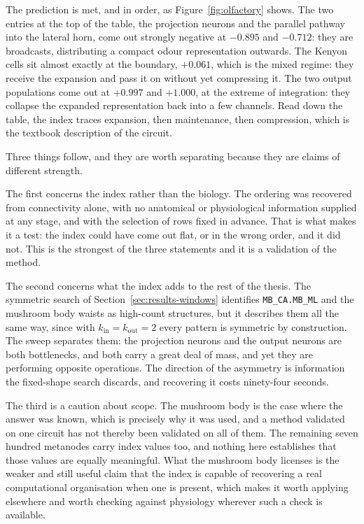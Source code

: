 \documentclass[12pt,a4paper,oneside]{article}
\theoremstyle{definition}
\theoremstyle{plain}
\newcommand{\kin}{k_{\mathrm{in}}}
\newcommand{\kout}{k_{\mathrm{out}}}
\newcommand{\code}[1]{\texttt{#1}}
\begin{document}
The prediction is met, and in order, as Figure~\ref{fig:olfactory} shows.
The two entries at the top of the
table, the projection neurons and the parallel pathway into the lateral
horn, come out strongly negative at $-0.895$ and $-0.712$: they are
broadcasts, distributing a compact odour representation outwards. The Kenyon
cells sit almost exactly at the boundary, $+0.061$, which is the mixed
regime: they receive the expansion and pass it on without yet compressing
it. The two output populations come out at $+0.997$ and $+1.000$, at the
extreme of integration: they collapse the expanded representation back into
a few channels. Read down the table, the index traces expansion, then
maintenance, then compression, which is the textbook description of the
circuit.

Three things follow, and they are worth separating because they are claims
of different strength.

The first concerns the index rather than the biology. The ordering was
recovered from connectivity alone, with no anatomical or physiological
information supplied at any stage, and with the selection of rows fixed in
advance. That is what makes it a test: the index could have come out flat,
or in the wrong order, and it did not. This is the strongest of the three
statements and it is a validation of the method.

The second concerns what the index adds to the rest of the thesis. The
symmetric search of Section~\ref{sec:results-windows} identifies
\code{MB\_CA.MB\_ML} and the mushroom body waists as high-count structures,
but it describes them all the same way, since with $\kin = \kout = 2$ every
pattern is symmetric by construction. The sweep separates them: the
projection neurons and the output neurons are both bottlenecks, and both
carry a great deal of mass, and yet they are performing opposite operations.
The direction of the asymmetry is information the fixed-shape search
discards, and recovering it costs ninety-four seconds.

The third is a caution about scope. The mushroom body is the case where the
answer was known, which is precisely why it was used, and a method validated
on one circuit has not thereby been validated on all of them. The remaining
seven hundred metanodes carry index values too, and nothing here establishes
that those values are equally meaningful. What the mushroom
body licenses is the weaker and still useful claim that the index is capable
of recovering a real computational organisation when one is present, which
makes it worth applying elsewhere and worth checking against physiology
wherever such a check is available.
\end{document}
